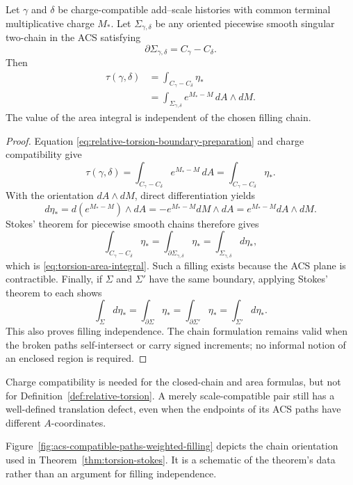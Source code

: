 \begin{theorem}
\label{thm:torsion-stokes}
Let \(\gamma\) and \(\delta\) be charge-compatible add--scale histories with
common terminal multiplicative charge \(M_*\).  Let
\(\Sigma_{\gamma,\delta}\) be any oriented piecewise smooth singular
two-chain in the ACS satisfying
\[
    \partial\Sigma_{\gamma,\delta}=C_\gamma-C_\delta.
\]
Then
\begin{align}
    \tau(\gamma,\delta)
      &=\int_{C_\gamma-C_\delta}\eta_*
        \label{eq:torsion-boundary-integral}\\
      &=\int_{\Sigma_{\gamma,\delta}}
          e^{M_*-M}\,dA\wedge dM.
        \label{eq:torsion-area-integral}
\end{align}
The value of the area integral is independent of the chosen filling chain.
\end{theorem}

\begin{proof}
Equation \eqref{eq:relative-torsion-boundary-preparation} and charge
compatibility give
\[
    \tau(\gamma,\delta)
       =\int_{C_\gamma-C_\delta}e^{M_*-M}\,dA
       =\int_{C_\gamma-C_\delta}\eta_*.
\]
With the orientation \(dA\wedge dM\), direct differentiation yields
\[
    d\eta_*
      =d(e^{M_*-M})\wedge dA
      =-e^{M_*-M}dM\wedge dA
      =e^{M_*-M}dA\wedge dM.
\]
Stokes' theorem for piecewise smooth chains therefore gives
\[
    \int_{C_\gamma-C_\delta}\eta_*
      =\int_{\partial\Sigma_{\gamma,\delta}}\eta_*
      =\int_{\Sigma_{\gamma,\delta}}d\eta_*,
\]
which is \eqref{eq:torsion-area-integral}.  Such a filling exists because the
ACS plane is contractible.  Finally, if \(\Sigma\) and \(\Sigma'\) have the
same boundary, applying Stokes' theorem to each shows
\[
    \int_\Sigma d\eta_*
       =\int_{\partial\Sigma}\eta_*
       =\int_{\partial\Sigma'}\eta_*
       =\int_{\Sigma'}d\eta_*.
\]
This also proves filling independence.  The chain formulation remains valid
when the broken paths self-intersect or carry signed increments; no informal
notion of an enclosed region is required.
\end{proof}

Charge compatibility is needed for the closed-chain and area formulas, but not
for Definition~\ref{def:relative-torsion}.  A merely scale-compatible pair
still has a well-defined translation defect, even when the endpoints of its ACS
paths have different \(A\)-coordinates.

Figure~\ref{fig:acs-compatible-paths-weighted-filling} depicts the chain
orientation used in Theorem~\ref{thm:torsion-stokes}.  It is a schematic of
the theorem's data rather than an argument for filling independence.


